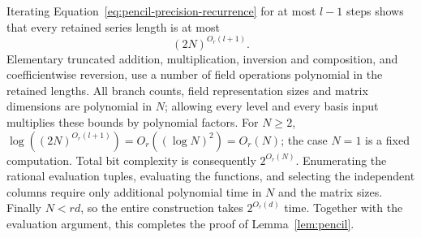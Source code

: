 Iterating Equation~\ref{eq:pencil-precision-recurrence} for at most
$l-1$ steps shows that every retained series length is at most
\[
 (2N)^{O_r(l+1)}.
\]
Elementary truncated addition, multiplication, inversion and
composition, and coefficientwise reversion, use a number of field
operations polynomial in the retained lengths.  All branch counts,
field representation sizes and matrix dimensions are polynomial in
$N$; allowing every level and every basis input multiplies these
bounds by polynomial factors.  For $N\geq2$,
$\log((2N)^{O_r(l+1)})=O_r((\log N)^2)=O_r(N)$; the case $N=1$ is a
fixed computation.  Total bit complexity is consequently $2^{O_r(N)}$.
Enumerating the rational evaluation tuples, evaluating the functions,
and selecting the independent columns require only additional
polynomial time in $N$ and the matrix sizes.
Finally $N<rd$, so the entire construction takes $2^{O_r(d)}$ time.
Together with the evaluation argument, this completes the proof of
Lemma~\ref{lem:pencil}.
